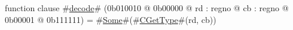 function clause #\hyperref[zdecode]{decode}# (0b010010 @ 0b00000 @ rd : regno @ cb : regno @    0b00001 @ 0b111111) = #\hyperref[zSome]{Some}#(#\hyperref[zCGetType]{CGetType}#(rd, cb))

